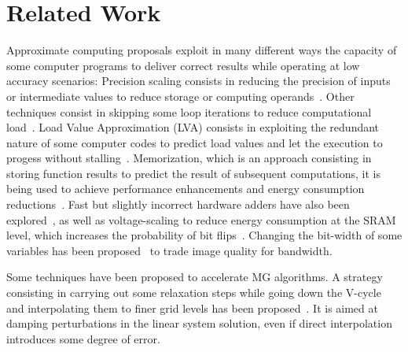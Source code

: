 \section{Related Work}
\label{sec:related}

Approximate computing proposals exploit in many different ways the capacity of
some computer programs to deliver correct results while operating at low
accuracy scenarios: Precision scaling consists in reducing the precision of
inputs or intermediate values to reduce storage or computing
operands~\cite{Yeh2007, Tian2015}.  Other techniques consist in skipping some
loop iterations to reduce computational load~\cite{Sidiroglou2011}.  Load Value
Approximation (LVA) consists in exploiting the redundant nature of some
computer codes to predict load values and let the execution to progess without
stalling~\cite{Miguel2014}.  Memorization, which is an approach consisting in
storing function results to predict the result of subsequent computations, it
is being used to achieve performance enhancements and energy consumption
reductions~\cite{Alvarez2005, Brumar2017}.  Fast but slightly incorrect
hardware adders have also been explored~\cite{Gupta:2011}, as well as
voltage-scaling to reduce energy consumption at the SRAM level, which increases
the probability of bit flips~\cite{Sampson:2011}.  Changing the bit-width of
some variables has been proposed~\cite{Park:2010} to trade image quality for
bandwidth.

Some techniques have been proposed to accelerate MG algorithms.  A strategy
consisting in   carrying out some relaxation steps while going down the V-cycle
and interpolating them to finer grid levels has been proposed~\cite{JAMESON}.
It is aimed at damping perturbations in the linear system solution, even if
direct interpolation introduces some degree of error.


